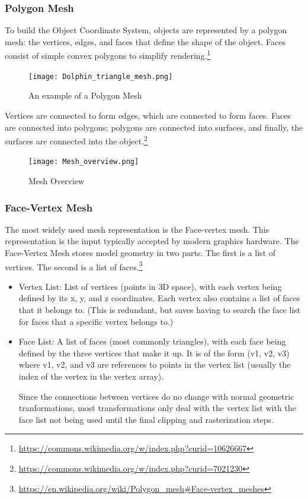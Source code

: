 \documentclass{article}
\begin{document}
\subsubsection{Polygon Mesh}
To build the Object Coordinate System, objects are represented by a polygon mesh: the vertices, edges, and faces that define the shape of the object. Faces consist of simple convex polygons to simplify rendering.\footnote{\url{https://commons.wikimedia.org/w/index.php?curid=10626667}}

\begin{figure}[H]
    \centering
    \texttt{[image: Dolphin\_triangle\_mesh.png]}
    \caption{An example of a Polygon Mesh}
    \label{dolphin}
\end{figure}

Vertices are connected to form edges, which are connected to form faces. Faces are connected into polygons; polygons are connected into surfaces, and finally, the surfaces are connected into the object.\footnote{\url{https://commons.wikimedia.org/w/index.php?curid=7021230}}

\begin{figure}[H]
    \centering
    \texttt{[image: Mesh\_overview.png]}
    \caption{Mesh Overview}
    \label{meshOverview}
\end{figure}

\subsubsection{Face-Vertex Mesh}
The most widely used mesh representation is the Face-vertex mesh. This representation is the input typically accepted by modern graphics hardware. The Face-Vertex Mesh stores model geometry in two parts. The first is a list of vertices. The second is a list of faces.\footnote{\url{https://en.wikipedia.org/wiki/Polygon_mesh\#Face-vertex_meshes}}

\begin{itemize}
\item{Vertex List:
List of vertices (points in 3D space), with each vertex being defined by its x, y, and z coordinates. Each vertex also contains a list of faces that it belongs to. (This is redundant, but saves having to search the face list for faces that a specific vertex belongs to.)}

\item{Face List:
A list of faces (most commonly triangles), with each face being defined by the three vertices that make it up. It is of the form (v1, v2, v3) where v1, v2, and v3 are references to points in the vertex list (usually the index of the vertex in the vertex array).

Since the connections between vertices do no change with normal geometric tranformations, most transformations only deal with the vertex list with the face list not being used until the final clipping and rasterization steps.}
\end{itemize}
\end{document}
